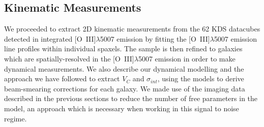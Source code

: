 \documentclass[fleqn,usenatbib]{mnras}
\begin{document}

\subsection{Kinematic Measurements}\label{subsection:kinematic_measurements}

We proceeded to extract 2D kinematic measurements from the 62 KDS datacubes detected in integrated [O~{\sc III}]$\lambda$5007 emission by fitting the [O~{\sc III}]$\lambda$5007 emission line profiles within individual spaxels.
The sample is then refined to galaxies which are spatially-resolved in the [O~{\sc III}]$\lambda$5007 emission in order to make dynamical measurements.
We also describe our dynamical modelling and the approach we have followed to extract $V_{C}$ and $\sigma_{int}$, using the models to derive beam-smearing corrections for each galaxy.
We made use of the imaging data described in the previous sections to reduce the number of free parameters in the model, an approach which is necessary when working in this signal to noise regime.  
\end{document}
